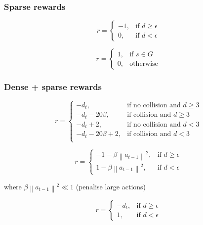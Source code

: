 \documentclass{article}
\newcommand{\norm}[1]{\left\lVert#1\right\rVert}
\begin{document}
\subsubsection{Sparse rewards}

\begin{equation}
r = \begin{cases}
    -1, & \text{if $d \geq \epsilon $}\\
    0, & \text{if $d < \epsilon $}
  \end{cases}
\end{equation}

\begin{equation}
r = \begin{cases}
    1, & \text{if $s \in G $}\\
    0, & \text{otherwise}
  \end{cases}
\end{equation}


\subsubsection{Dense + sparse rewards}

\begin{equation}
r = \begin{cases}
    -d_t, & \text{if no collision and $d \geq 3$}\\
    -d_t - 20\beta , & \text{if collision and $d \geq 3$}\\
    -d_t + 2 , & \text{if no collision and $d < 3$} \\
    -d_t - 20\beta + 2, & \text{if collision and $d < 3$}\\
  \end{cases}
\end{equation}

\begin{equation}
r = \begin{cases}
    - 1 - \beta \norm{a_{t-1}}^2, & \text{if $d \geq \epsilon $}\\
    1 - \beta \norm{a_{t-1}}^2, & \text{if $d < \epsilon $}
  \end{cases}
\end{equation}

where $\beta \norm{a_{t-1}}^2 \ll 1$ (penalise large actions)

\begin{equation}
r = \begin{cases}
    - d_t , & \text{if $d \geq \epsilon $}\\
    1 , & \text{if $d < \epsilon $}
  \end{cases}
\end{equation}
\end{document}
